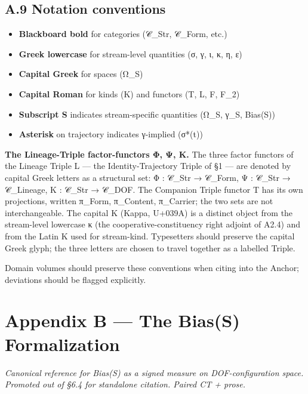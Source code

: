 \documentclass[11pt, openany]{book}
\newcommand{\sectionbreak}{\clearpage}
\begin{document}
\sectionbreak

\section{A.9 Notation conventions}

\begin{itemize}
\item \textbf{Blackboard bold} for categories (𝒞\_\allowbreak{}Str, 𝒞\_\allowbreak{}Form, etc.)
\item \textbf{Greek lowercase} for stream-level quantities (σ, γ, ι, κ, η, ε)
\item \textbf{Capital Greek} for spaces (Ω\_\allowbreak{}S)
\item \textbf{Capital Roman} for kinds (K) and functors (T, L, F, F\_\allowbreak{}2)
\item \textbf{Subscript S} indicates stream-specific quantities (Ω\_\allowbreak{}S, γ\_\allowbreak{}S, Bias(S))
\item \textbf{Asterisk} on trajectory indicates γ-implied (σ*(t))
\end{itemize}

\textbf{The Lineage-Triple factor-functors Φ, Ψ, Κ.} The three factor functors of the Lineage Triple L --- the Identity-Trajectory Triple of §1 --- are denoted by capital Greek letters as a structural set: Φ : 𝒞\_\allowbreak{}Str → 𝒞\_\allowbreak{}Form, Ψ : 𝒞\_\allowbreak{}Str → 𝒞\_\allowbreak{}Lineage, Κ : 𝒞\_\allowbreak{}Str → 𝒞\_\allowbreak{}DOF. The Companion Triple functor T has its own projections, written π\_\allowbreak{}Form, π\_\allowbreak{}Content, π\_\allowbreak{}Carrier; the two sets are not interchangeable. The capital Κ (Kappa, U+039A) is a distinct object from the stream-level lowercase κ (the cooperative-constituency right adjoint of A2.4) and from the Latin K used for stream-kind. Typesetters should preserve the capital Greek glyph; the three letters are chosen to travel together as a labelled Triple.

Domain volumes should preserve these conventions when citing into the Anchor; deviations should be flagged explicitly.

\chapter{Appendix B — The Bias(S) Formalization}


\textit{Canonical reference for Bias(S) as a signed measure on DOF-configuration space. Promoted out of §6.4 for standalone citation. Paired CT + prose.}
\end{document}
